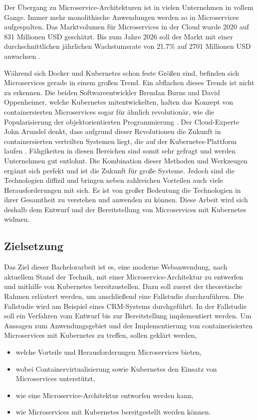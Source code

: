 Der Übergang zu Microservice-Architekturen ist in vielen Unternehmen in vollem Gange. Immer mehr monolithische Anwendungen werden so in Microservices aufgespalten. Das Marktvolumen für Microservices in der Cloud wurde 2020 auf 831 Millionen \ac{USD} geschätzt. Bis zum Jahre 2026 soll der Markt mit einer durchschnittlichen jährlichen Wachstumsrate von 21.7\%  auf 2701 Millionen \ac{USD} anwachsen \parencite[vgl.][S. 7]{mordorintelligenceGlobal2020}.

Während sich Docker und Kubernetes schon feste Größen sind, befinden sich Microservices gerade in einem großen Trend. Ein abflachen dieses Trends ist nicht zu erkennen. Die beiden Softwareentwickler Brendan Burns und David Oppenheimer, welche Kubernetes mitentwickelten, halten das Konzept von containersierten Microservices sogar für ähnlich revolutionär, wie die Popularisierung der objektorientierten Programmierung \parencite[vgl.][S. 1]{burnsDesign2016}. Der Cloud-Experte John Arundel denkt, dass aufgrund dieser Revolutionen die Zukunft in containersierten verteilten Systemen liegt, die auf der Kubernetes-Plattform laufen \parencite[vgl.][S. 1]{arundelCloud2019}. Fähgikeiten in diesen Bereichen sind somit sehr gefragt und werden Unternehmen gut entlohnt. Die Kombination dieser Methoden und Werkzeugen ergänzt sich perfekt und ist die Zukunft für große Systeme. Jedoch sind die Technologien diffizil und bringen neben zahlreichen Vorteilen auch viele Herausforderungen mit sich. Es ist von großer Bedeutung die Technologien in ihrer Gesamtheit zu verstehen und anwenden zu können. Diese Arbeit wird sich deshalb dem Entwurf und der Bereitstellung von Microservices mit Kubernetes widmen.
  
\subsection{Zielsetzung}
Das Ziel dieser Bachelorarbeit ist es, eine moderne Webanwendung, nach aktuellem Stand der Technik, mit einer Microservice-Architektur zu entwerfen und mithilfe von Kubernetes bereitzustellen. Dazu soll zuerst der theoretische Rahmen erläutert werden, um anschließend eine Fallstudie durchzuführen. Die Fallstudie wird am Beispiel eines \ac{CRM}-Systems durchgeführt. In der Fallstudie soll ein Verfahren vom Entwurf bis zur Bereitstellung implementiert werden. Um Aussagen zum Anwendungsgebiet und der Implementierung von containerisierten Microservices mit Kubernetes zu treffen, sollen geklärt werden, 

\begin{itemize}
\item welche Vorteile und Herausforderungen Microservices bieten,
\item wobei Containervirtualisierung sowie Kubernetes den Einsatz von Microservices unterstützt,
\item wie eine Microservice-Architektur entworfen werden kann,
\item wie Microservices mit Kubernetes bereitgestellt werden können.
\end{itemize}

